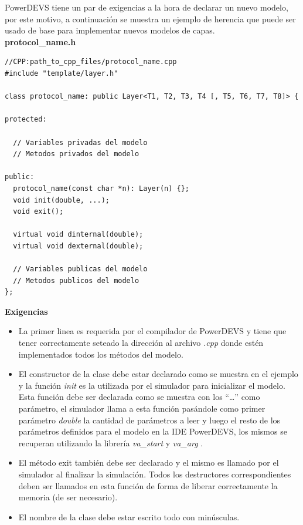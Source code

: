 \documentclass[10pt,a4paper]{article}
\begin{document}
PowerDEVS tiene un par de exigencias a la hora de declarar un nuevo modelo, por este motivo, a continuación se muestra un ejemplo de herencia que puede ser usado de base para implementar nuevos modelos de capas. \\

\textbf{protocol\_name.h}
\begin{lstlisting}
//CPP:path_to_cpp_files/protocol_name.cpp
#include "template/layer.h"

class protocol_name: public Layer<T1, T2, T3, T4 [, T5, T6, T7, T8]> { 

protected:
	
  // Variables privadas del modelo
  // Metodos privados del modelo

public:
  protocol_name(const char *n): Layer(n) {};
  void init(double, ...);
  void exit();

  virtual void dinternal(double);
  virtual void dexternal(double);
  
  // Variables publicas del modelo
  // Metodos publicos del modelo
};
\end{lstlisting}

\textbf{Exigencias}
\begin{itemize}
\item La primer linea es requerida por el compilador de PowerDEVS y tiene que tener correctamente seteado la dirección al archivo \textit{.cpp} donde estén implementados todos los métodos del modelo.
\item El constructor de la clase debe estar declarado como se muestra en el ejemplo y la función \textit{init} es la utilizada por el simulador para inicializar el modelo. Esta función debe ser declarada como se muestra con los ``\ldots'' como parámetro, el simulador llama a esta función pasándole como primer parámetro \textit{double} la cantidad de parámetros a leer y luego el resto de los parámetros definidos para el modelo en la IDE PowerDEVS, los mismos se recuperan utilizando la librería \textit{va\_start} y \textit{va\_arg} \cite{vastart} \cite{vaarg}.
\item El método exit también debe ser declarado y el mismo es llamado por el simulador al finalizar la simulación. Todos los destructores correspondientes deben ser llamados en esta función de forma de liberar correctamente la memoria (de ser necesario).
\item El nombre de la clase debe estar escrito todo con minúsculas.
\end{itemize}
\end{document}
